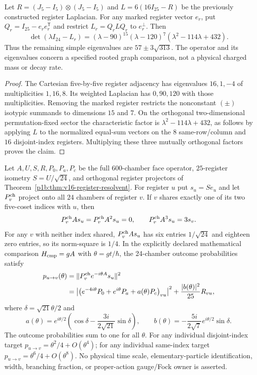 \documentclass[11pt]{article}
\begin{document}
\begin{proposition}
\label{p1b:prop:v368-rooted-register-laplacian}
Let $R=(J_5-I_5)\otimes(J_5-I_5)$ and $L=6(16I_{25}-R)$
be the previously constructed register Laplacian.  For any marked
register vector $e_r$, put $Q_r=I_{25}-e_re_r^{\mathsf T}$ and restrict
$L_r=Q_rLQ_r$ to $e_r^\perp$. Then
\[
\det(\lambda I_{24}-L_r)
=(\lambda-90)^{15}(\lambda-120)^7
 (\lambda^2-114\lambda+432).
\]
Thus the remaining simple eigenvalues are $57\pm3\sqrt{313}$.
The operator and its eigenvalues concern a specified rooted graph
comparison, not a physical charged mass or decay rate.
\end{proposition}
\begin{proof}
The Cartesian five-by-five register adjacency has eigenvalues
$16,1,-4$ of multiplicities $1,16,8$. Its weighted Laplacian has
$0,90,120$ with those multiplicities.  Removing the marked register
restricts the nonconstant $(\pm)$ isotypic summands to dimensions
$15$ and $7$. On the orthogonal two-dimensional permutation-fixed
sector the characteristic factor is $\lambda^2-114\lambda+432$,
as follows by applying $L$ to the normalized equal-sum vectors on
the $8$ same-row/column and $16$ disjoint-index registers.
Multiplying these three mutually orthogonal factors proves the claim.
\end{proof}
\begin{theorem}
\label{p1b:thm:v368-chamber-three-step-unitary}
Let $A,U,S,R,P_0,P_a,P_c$ be the full $600$-chamber face operator,
$25$-register isometry $S=U/\sqrt{24}$, and orthogonal register
projectors of Theorem~\ref{p1b:thm:v16-register-resolvent}.  For
register $u$ put $s_u=Se_u$ and let $P_v^{\rm ch}$ project onto all
$24$ chambers of register $v$.  If $v$ shares exactly one of its two
five-coset indices with $u$, then
\[
P_v^{\rm ch}As_u=P_v^{\rm ch}A^2s_u=0,\qquad
P_v^{\rm ch}A^3s_u=3s_v.
\]
For any $v$ with neither index shared, $P_v^{\rm ch}As_u$ has six
entries $1/\sqrt{24}$ and eighteen zero entries, so its norm-square
is $1/4$.  In the explicitly declared mathematical comparison
$H_{\rm cmp}=gA$ with $\theta=gt/\hbar$, the 24-chamber outcome
probabilities satisfy
\[
\begin{aligned}
p_{u\to v}(\theta)&=\|P_v^{\rm ch}e^{-i\theta A}s_u\|^2\\
&=\left|\left(e^{-4i\theta}P_0+e^{i\theta}P_a
+a(\theta)P_c\right)_{vu}\right|^2
+\frac{|b(\theta)|^2}{25}R_{vu},
\end{aligned}
\]
where $\delta=\sqrt{21}\theta/2$ and
\[
a(\theta)=e^{i\theta/2}\left(\cos\delta-
\frac{3i}{2\sqrt{21}}\sin\delta\right),\qquad
b(\theta)=-\frac{5i}{2\sqrt7}e^{i\theta/2}\sin\delta.
\]
The outcome probabilities sum to one for all $\theta$.
For any individual disjoint-index target
$p_{u\to v}=\theta^2/4+O(\theta^4)$; for any individual
same-index target $p_{u\to v}=\theta^6/4+O(\theta^8)$.
No physical time scale, elementary-particle identification, width,
branching fraction, or proper-action gauge/Fock owner is asserted.
\end{theorem}
\end{document}

